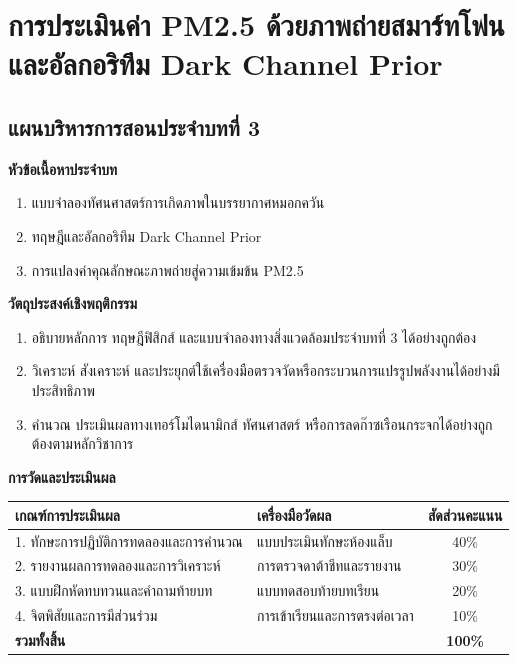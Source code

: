 \chapter{การประเมินค่า PM2.5 ด้วยภาพถ่ายสมาร์ทโฟนและอัลกอริทึม Dark Channel Prior}
\label{chap:ch03}

\section*{แผนบริหารการสอนประจำบทที่ 3}

\noindent\textbf{หัวข้อเนื้อหาประจำบท}
\begin{enumerate}
    \item แบบจำลองทัศนศาสตร์การเกิดภาพในบรรยากาศหมอกควัน
    \item ทฤษฎีและอัลกอริทึม Dark Channel Prior
    \item การแปลงค่าคุณลักษณะภาพถ่ายสู่ความเข้มข้น PM2.5
\end{enumerate}

\noindent\textbf{วัตถุประสงค์เชิงพฤติกรรม}
\begin{enumerate}
    \item อธิบายหลักการ ทฤษฎีฟิสิกส์ และแบบจำลองทางสิ่งแวดล้อมประจำบทที่ 3 ได้อย่างถูกต้อง
    \item วิเคราะห์ สังเคราะห์ และประยุกต์ใช้เครื่องมือตรวจวัดหรือกระบวนการแปรรูปพลังงานได้อย่างมีประสิทธิภาพ
    \item คำนวณ ประเมินผลทางเทอร์โมไดนามิกส์ ทัศนศาสตร์ หรือการลดก๊าซเรือนกระจกได้อย่างถูกต้องตามหลักวิชาการ
\end{enumerate}

\noindent\textbf{การวัดและประเมินผล}
\begin{table}[H]
\centering\small
\begin{tabularx}{\textwidth}{p{} p{} c}
\toprule
\textbf{เกณฑ์การประเมินผล} & \textbf{เครื่องมือวัดผล} & \textbf{สัดส่วนคะแนน} \\
\midrule
1. ทักษะการปฏิบัติการทดลองและการคำนวณ & แบบประเมินทักษะห้องแล็บ & 40\% \\
2. รายงานผลการทดลองและการวิเคราะห์ & การตรวจดาต้าชีทและรายงาน & 30\% \\
3. แบบฝึกหัดทบทวนและคำถามท้ายบท & แบบทดสอบท้ายบทเรียน & 20\% \\
4. จิตพิสัยและการมีส่วนร่วม & การเข้าเรียนและการตรงต่อเวลา & 10\% \\
\midrule
\textbf{รวมทั้งสิ้น} & & \textbf{100\%} \\
\bottomrule
\end{tabularx}
\end{table}
\newpage

